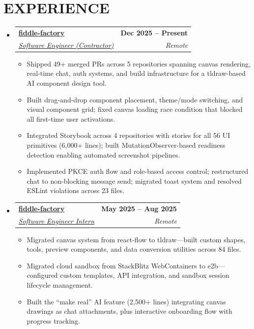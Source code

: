 \documentclass[letterpaper, 10pt]{article}
\makeatletter
\newcommand{\resumeItem}[1]{ \item\small{ {#1 \vspace{-3pt}} } }
\newcommand{\resumeSubheading}[4]{
\vspace{-2pt}
\item
\begin{tabular*}{1.0\textwidth}[t]{l@{\extracolsep{\fill}}r}
  \textbf{#1} & \textbf{\small #2} \\
  \textit{\small#3} & \textit{\small #4} \\
\end{tabular*}
\vspace{-5pt}
}
\newcommand{\resumeSubHeadingListStart}{\begin{itemize}[leftmargin=0.0in, label={}]}
\newcommand{\resumeSubHeadingListEnd}{\end{itemize}}
\newcommand{\resumeItemListStart}{\begin{itemize}
\vspace{-3pt}}
\newcommand{\resumeItemListEnd}{\end{itemize}
\vspace{-5pt}}
\makeatother
\begin{document}
  \section{EXPERIENCE}
  \resumeSubHeadingListStart \resumeSubheading {\href{https://fiddle.is}{fiddle-factory}}{Dec 2025 -- Present}
  {\underline{Software Engineer (Contractor)}}{Remote} \resumeItemListStart \resumeItem{\normalsize{Shipped 49+ merged PRs across 5 repositories spanning canvas rendering, real-time chat, auth systems, and build infrastructure for a tldraw-based AI component design tool.}}
  \resumeItem{\normalsize{Built drag-and-drop component placement, theme/mode switching, and visual component grid; fixed canvas loading race condition that blocked all first-time user activations.}}
  \resumeItem{\normalsize{Integrated Storybook across 4 repositories with stories for all 56 UI primitives (6,000+ lines); built MutationObserver-based readiness detection enabling automated screenshot pipelines.}}
  \resumeItem{\normalsize{Implemented PKCE auth flow and role-based access control; restructured chat to non-blocking message send; migrated toast system and resolved ESLint violations across 23 files.}}
  \resumeItemListEnd \resumeSubheading {\href{https://fiddle.is}{fiddle-factory}}{May 2025 -- Aug 2025}
  {\underline{Software Engineer Intern}}{Remote} \resumeItemListStart \resumeItem{\normalsize{Migrated canvas system from react-flow to tldraw---built custom shapes, tools, preview components, and data conversion utilities across 84 files.}}
  \resumeItem{\normalsize{Migrated cloud sandbox from StackBlitz WebContainers to e2b---configured custom templates, API integration, and sandbox session lifecycle management.}}
  \resumeItem{\normalsize{Built the ``make real'' AI feature (2,500+ lines) integrating canvas drawings as chat attachments, plus interactive onboarding flow with progress tracking.}}
  \resumeItemListEnd \resumeSubHeadingListEnd
  \vspace{-14pt}

\end{document}
